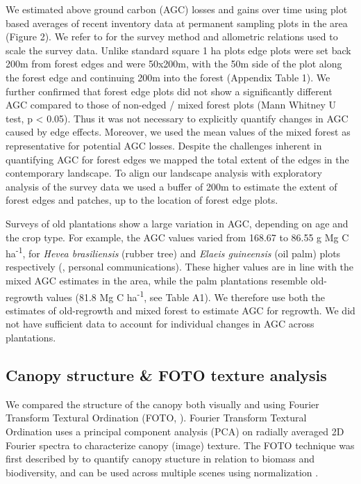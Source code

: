 \documentclass[remote sensing,article,submit,moreauthors,pdftex,10pt,a4paper]{mdpi}
\begin{document}
We estimated above ground carbon (AGC) losses and gains over time using
plot based averages of recent inventory data at permanent sampling plots
in the area (Figure 2). We refer to \citet{Kearsley2013} for the survey
method and allometric relations used to scale the survey data. Unlike
standard square 1 ha plots edge plots were set back 200m from forest
edges and were 50x200m, with the 50m side of the plot along the forest
edge and continuing 200m into the forest (Appendix Table 1). We further
confirmed that forest edge plots did not show a significantly different
AGC compared to those of non-edged / mixed forest plots (Mann Whitney U
test, p \textless{} 0.05). Thus it was not necessary to explicitly
quantify changes in AGC caused by edge effects. Moreover, we used the
mean values of the mixed forest as representative for potential AGC
losses. Despite the challenges inherent in quantifying AGC for forest
edges we mapped the total extent of the edges in the contemporary
landscape. To align our landscape analysis with exploratory analysis of
the survey data we used a buffer of 200m to estimate the extent of
forest edges and patches, up to the location of forest edge plots.

Surveys of old plantations show a large variation in AGC, depending on
age and the crop type. For example, the AGC values varied from 168.67 to
86.55 g Mg C ha\textsuperscript{-1}, for \emph{Hevea brasiliensis}
(rubber tree) and \emph{Elaeis guineensis} (oil palm) plots respectively
(\citet{bustillo2018}, personal communications). These higher values are
in line with the mixed AGC estimates in the area, while the palm
plantations resemble old-regrowth values (81.8 Mg C
ha\textsuperscript{-1}, see Table A1). We therefore use both the
estimates of old-regrowth and mixed forest to estimate AGC for regrowth.
We did not have sufficient data to account for individual changes in AGC
across plantations.

\hypertarget{canopy-structure-foto-texture-analysis}{%
\subsection{Canopy structure \& FOTO texture
analysis}\label{canopy-structure-foto-texture-analysis}}

We compared the structure of the canopy both visually and using Fourier
Transform Textural Ordination (FOTO, \citet{couteron2002}). Fourier
Transform Textural Ordination uses a principal component analysis (PCA)
on radially averaged 2D Fourier spectra to characterize canopy (image)
texture. The FOTO technique was first described by \citet{couteron2002}
to quantify canopy stucture in relation to biomass and biodiversity, and
can be used across multiple scenes using normalization
\citep{Barbier2010}.
\end{document}
